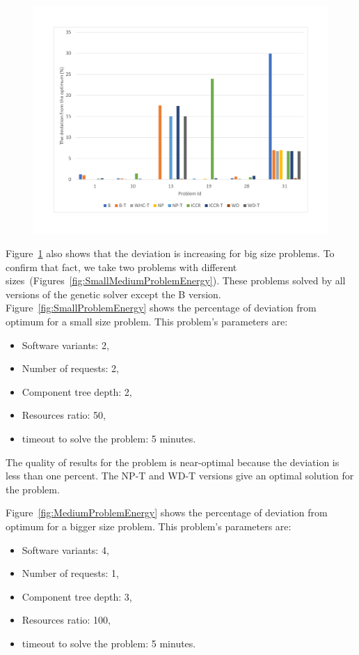 \begin{figure}
	\centering
	\includegraphics[width=\textwidth]{images/EnergyPercentage.pdf}
	\caption[]{}
	\label{fig:EnergyPercentage}
\end{figure}

Figure~\ref{fig:EnergyPercentage} also shows that the deviation is increasing for big size problems. To confirm that fact, we take two problems with different sizes~(Figures~\ref{fig:SmallMediumProblemEnergy}). These problems solved by all versions of the genetic solver except the B version. Figure~\ref{fig:SmallProblemEnergy} shows the percentage of deviation from optimum for a small size problem. This problem's parameters are:
\begin{itemize}
	\item Software variants: 2,
	\item Number of requests: 2,
	\item Component tree depth: 2,
	\item Resources ratio: 50,
	\item timeout to solve the problem: 5 minutes.
\end{itemize}

The quality of results for the problem is near-optimal because the deviation is less than one percent. The NP-T and WD-T versions give an optimal solution for the problem.

Figure~\ref{fig:MediumProblemEnergy} shows the percentage of deviation from optimum for a bigger size problem. This problem's parameters are:
\begin{itemize}
	\item Software variants: 4,
	\item Number of requests: 1,
	\item Component tree depth: 3,
	\item Resources ratio: 100,
	\item timeout to solve the problem: 5 minutes.
\end{itemize}


